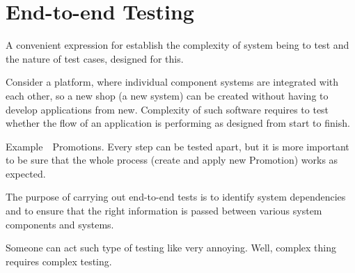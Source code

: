 \section{End-to-end Testing}
\label{sec:End-to-end Testing}

A convenient expression for establish the complexity of system being to test and the nature of test cases, designed for this.

Consider a platform, where individual component systems are integrated with each other, so a new shop (a new system) can be created without having to develop applications from new. Complexity of such software requires to test whether the flow of an application is performing as designed from start to finish.

Example~\textemdash~Promotions. Every step can be tested apart, but it is more important to be sure that the whole process (create and apply new Promotion) works as expected.

The purpose of carrying out end-to-end tests is to identify system dependencies and to ensure that the right information is passed between various system components and systems.

Someone can act such type of testing like very annoying. Well, complex thing requires complex testing.
